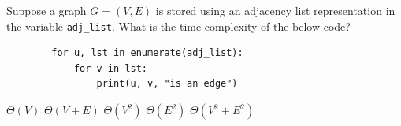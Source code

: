 \begin{prob}
    Suppose a graph $G = (V, E)$ is stored using an adjacency list representation in
    the variable \texttt{adj\_list}.
    What is the time complexity of the below code?

    \begin{verbatim}
        for u, lst in enumerate(adj_list):
            for v in lst:
                print(u, v, "is an edge")
    \end{verbatim}

    \begin{choices}
        \choice $\Theta(V)$
        \correctchoice $\Theta(V + E)$
        \choice $\Theta(V^2)$
        \choice $\Theta(E^2)$
        \choice $\Theta(V^2 + E^2)$
    \end{choices}

\end{prob}